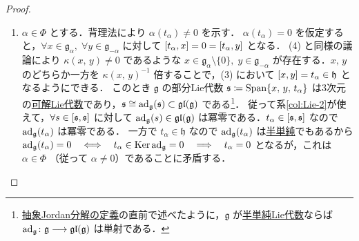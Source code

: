 \documentclass[rep_main]{subfiles}
\begin{document}
\begin{proof}
\begin{enumerate}
		\item $\alpha \in \Phi$ とする．背理法により $\alpha(t_\alpha) \neq 0$ を示す．
		$\alpha(t_\alpha) = 0$ を仮定すると，$\forall x \in \mathfrak{g}_\alpha,\; \forall y \in \mathfrak{g}_{-\alpha}$ に対して $\comm{t_\alpha}{x} = 0 = \comm{t_\alpha}{y}$ となる．
		(4) と同様の議論により $\kappa(x,\, y) \neq 0$ であるような $x \in \mathfrak{g}_\alpha \setminus \{0\},\; y \in \mathfrak{g}_{-\alpha}$ が存在する．$x,\, y$ のどちらか一方を $\kappa(x,\, y)^{-1}$ 倍することで，(3) において $\comm{x}{y} = t_\alpha \in \mathfrak{h}$ となるようにできる．
		このとき $\mathfrak{g}$ の部分Lie代数 $\mathfrak{s} \coloneqq \operatorname{Span} \{x,\, y,\, t_\alpha\}$ は3次元の\hyperref[def:solvable-LieAlg]{可解Lie代数}であり，$\mathfrak{s} \cong \operatorname{ad}_{\mathfrak{g}}(\mathfrak{s}) \subset \mathfrak{gl}(\mathfrak{g})$ である\footnote{\hyperref[def:abstruct-JC]{抽象Jordan分解の定義}の直前で述べたように，$\mathfrak{g}$ が\hyperref[def:semisimple-LieAlg]{半単純Lie代数}ならば $\operatorname{ad}_{\mathfrak{g}} \colon \mathfrak{g} \longrightarrow \mathfrak{gl}(\mathfrak{g})$ は単射である．}．
		従って系\ref{col:Lie-2}が使えて，$\forall s \in \comm{\mathfrak{s}}{\mathfrak{s}}$ に対して $\operatorname{ad}_{\mathfrak{g}}(s) \in \mathfrak{gl}(\mathfrak{g})$ は冪零である．$t_\alpha \in \comm{\mathfrak{s}}{\mathfrak{s}}$ なので $\operatorname{ad}_{\mathfrak{g}}(t_\alpha)$ は冪零である．
		一方で $t_\alpha \in \mathfrak{h}$ なので $\operatorname{ad}_{\mathfrak{g}}(t_\alpha)$ は\hyperref[def:semisimple-end]{半単純}でもあるから $\operatorname{ad}_{\mathfrak{g}}(t_\alpha) = 0 \quad \Longleftrightarrow \quad t_\alpha \in \operatorname{Ker} \operatorname{ad}_{\mathfrak{g}} = 0 \quad \Longrightarrow \quad t_\alpha = 0$ となるが，これは $\alpha \in \Phi$ （従って $\alpha \neq 0$）であることに矛盾する．


\end{enumerate}
\end{proof}
\end{document}

